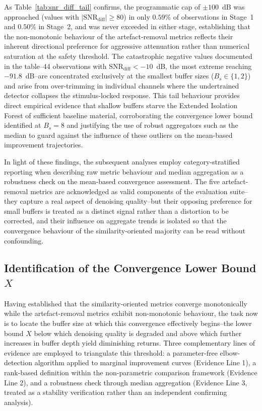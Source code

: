 \documentclass[MScCS,12pt,oneside,final]{uccthesis}
\begin{document}
As Table~\ref{tab:snr_diff_tail} confirms, the programmatic cap of $\pm 100$~dB was approached (values with $|\mathrm{SNR}_{\mathrm{diff}}| \geq 80$) in only $0.59\%$ of observations in Stage~1 and $0.50\%$ in Stage~2, and was never exceeded in either stage, establishing that the non-monotonic behaviour of the artefact-removal metrics reflects their inherent directional preference for aggressive attenuation rather than numerical saturation at the safety threshold. The catastrophic negative values documented in the table--44 observations with $\mathrm{SNR}_{\mathrm{diff}} < -10$~dB, the most extreme reaching $-91.8$~dB--are concentrated exclusively at the smallest buffer sizes ($B_s \in \{1, 2\}$) and arise from over-trimming in individual channels where the undertrained detector collapses the stimulus-locked response. This tail behaviour provides direct empirical evidence that shallow buffers starve the Extended Isolation Forest of sufficient baseline material, corroborating the convergence lower bound identified at $B_s = 8$ and justifying the use of robust aggregators such as the median to guard against the influence of these outliers on the mean-based improvement trajectories.

In light of these findings, the subsequent analyses employ category-stratified reporting when describing raw metric behaviour and median aggregation as a robustness check on the mean-based convergence assessment. The five artefact-removal metrics are acknowledged as valid components of the evaluation suite--they capture a real aspect of denoising quality--but their opposing preference for small buffers is treated as a distinct signal rather than a distortion to be corrected, and their influence on aggregate trends is isolated so that the convergence behaviour of the similarity-oriented majority can be read without confounding.

    \subsection{Identification of the Convergence Lower Bound $X$}
\label{subsec:identification_threshold}

Having established that the similarity-oriented metrics converge monotonically while the artefact-removal metrics exhibit non-monotonic behaviour, the task now is to locate the buffer size at which this convergence effectively begins--the lower bound $X$ below which denoising quality is degraded and above which further increases in buffer depth yield diminishing returns. Three complementary lines of evidence are employed to triangulate this threshold: a parameter-free elbow-detection algorithm applied to marginal improvement curves (Evidence Line 1), a rank-based definition within the non-parametric comparison framework (Evidence Line 2), and a robustness check through median aggregation (Evidence Line 3, treated as a stability verification rather than an independent confirming analysis).
\end{document}
